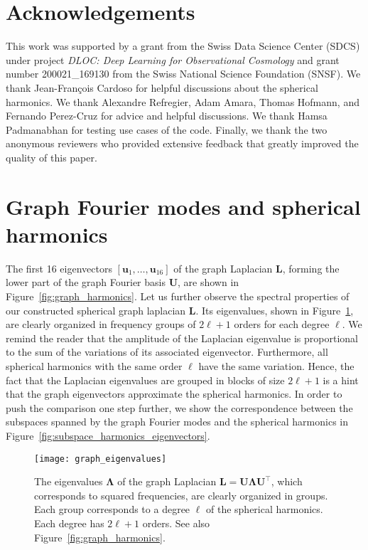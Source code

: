 \documentclass[final,twocolumn,3p,times,sort&compress]{elsarticle}
\newcommand{\figref}[1]{Figure~\ref{fig:#1}}
\renewcommand{\b}[1]{{\bm{#1}}}   %
\newcommand{\1}{\b{1}}              %
\newcommand{\0}{\b{0}}              %
\renewcommand{\L}{\b{L}}
\newcommand{\U}{\b{U}}
\newcommand{\trans}{^\intercal}
\newcommand{\bLambda}{\b{\Lambda}}
\begin{document}
\section*{Acknowledgements}

This work was supported by a grant from the Swiss Data Science Center (SDCS) under project \textit{DLOC:  Deep Learning for Observational Cosmology} and grant number 200021\_169130 from the Swiss National Science Foundation (SNSF).
We thank Jean-François Cardoso for helpful discussions about the spherical harmonics.
We thank Alexandre Refregier, Adam Amara, Thomas Hofmann, and Fernando Perez-Cruz for advice and helpful discussions.
We thank Hamsa Padmanabhan for testing use cases of the code.
Finally, we thank the two anonymous reviewers who provided extensive feedback that greatly improved the quality of this paper.

\appendix

\section{Graph Fourier modes and spherical harmonics}
\label{sec:comparison_spherical_harmonics}

The first 16 eigenvectors $[\b u_1, \ldots, \b u_{16}]$ of the graph Laplacian $\L$, forming the lower part of the graph Fourier basis $\U$, are shown in \figref{graph_harmonics}.
Let us further observe the spectral properties of our constructed spherical graph laplacian $\L$.
Its eigenvalues, shown in \figref{graph_eigenvalues}, are clearly organized in frequency groups of $2\ell + 1$ orders for each degree $\ell$.
We remind the reader that the amplitude of the Laplacian eigenvalue is proportional to the sum of the variations of its associated eigenvector. Furthermore, all spherical harmonics with the same order $\ell$ have the same variation. Hence, the fact that the Laplacian eigenvalues are grouped in blocks of size $2\ell + 1$ is a hint that the graph eigenvectors approximate the spherical harmonics.
In order to push the comparison one step further, we show the correspondence between the subspaces spanned by the graph Fourier modes and the spherical harmonics in \figref{subspace_harmonics_eigenvectors}.

\begin{figure}[t!]
	\centering
	\texttt{[image: graph\_eigenvalues]}
	\caption{The eigenvalues $\bLambda$ of the graph Laplacian $\L = \U \bLambda \U\trans$, which corresponds to squared frequencies, are clearly organized in groups. Each group corresponds to a degree $\ell$ of the spherical harmonics. Each degree has $2\ell + 1$ orders. See also \figref{graph_harmonics}.}
	\label{fig:graph_eigenvalues}
\end{figure}
\end{document}
